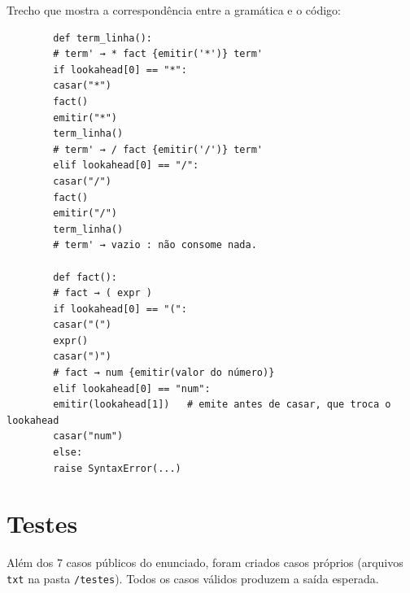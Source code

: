\documentclass[11pt,a4paper]{article}
\begin{document}
	Trecho que mostra a correspondência entre a gramática e o código:
	
	\begin{lstlisting}
		def term_linha():
		# term' → * fact {emitir('*')} term'
		if lookahead[0] == "*":
		casar("*")
		fact()
		emitir("*")
		term_linha()
		# term' → / fact {emitir('/')} term'
		elif lookahead[0] == "/":
		casar("/")
		fact()
		emitir("/")
		term_linha()
		# term' → vazio : não consome nada.
		
		def fact():
		# fact → ( expr )
		if lookahead[0] == "(":
		casar("(")
		expr()
		casar(")")
		# fact → num {emitir(valor do número)}
		elif lookahead[0] == "num":
		emitir(lookahead[1])   # emite antes de casar, que troca o lookahead
		casar("num")
		else:
		raise SyntaxError(...)
	\end{lstlisting}
	
	\section{Testes}
	
	Além dos 7 casos públicos do enunciado, foram criados casos próprios (arquivos \texttt{txt} na pasta \texttt{/testes}). Todos os casos válidos produzem a saída esperada.
	
\end{document}
